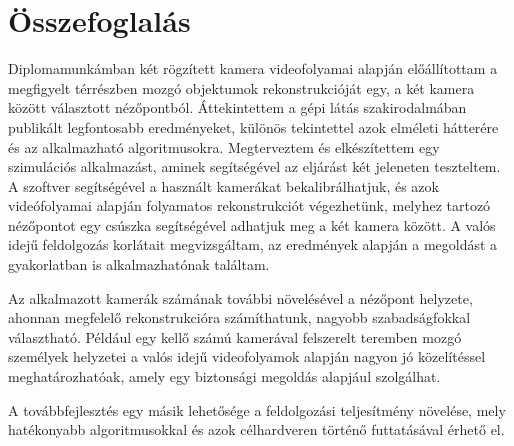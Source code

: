 \chapter{Összefoglalás}

Diplomamunkámban két rögzített kamera videofolyamai alapján előállítottam a megfigyelt térrészben mozgó objektumok rekonstrukcióját egy, a két kamera között választott nézőpontból. Áttekintettem a gépi látás szakirodalmában publikált legfontosabb eredményeket, különös tekintettel azok elméleti hátterére és az alkalmazható algoritmusokra. Megterveztem és elkészítettem egy szimulációs alkalmazást, aminek segítségével az eljárást két jeleneten teszteltem. A szoftver segítségével a használt kamerákat bekalibrálhatjuk, és azok videófolyamai alapján folyamatos rekonstrukciót végezhetünk, melyhez tartozó nézőpontot egy csúszka segítségével adhatjuk meg a két kamera között. A valós idejű feldolgozás korlátait megvizsgáltam, az eredmények alapján a megoldást a gyakorlatban is alkalmazhatónak találtam.

Az alkalmazott kamerák számának további növelésével a nézőpont helyzete, ahonnan megfelelő rekonstrukcióra számíthatunk, nagyobb szabadságfokkal választható. Például egy kellő számú kamerával felszerelt teremben mozgó személyek helyzetei a valós idejű videofolyamok alapján nagyon jó közelítéssel meghatározhatóak, amely egy biztonsági megoldás alapjául szolgálhat.

A továbbfejlesztés egy másik lehetősége a feldolgozási teljesítmény növelése, mely hatékonyabb algoritmusokkal és azok célhardveren történő futtatásával érhető el.
